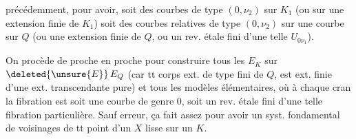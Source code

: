 précédemment, pour avoir, soit des courbes de type $(0,\nu_2)$ sur $K_1$\unsure{,} (ou sur une extension finie de $K_1$) soit des courbes relatives de type $(0,\nu_2)$ sur une courbe sur $Q$  (ou une extension finie de $Q$, ou un rev.  étale fini d'une telle $U_{0\nu_1}$).

On procède de proche en proche pour construire  tous les $E_K$ sur $\deleted{\unsure{E}}\,E_Q$ (car tt corps ext. de type fini de $Q$, est ext. finie d'une ext. transcendante pure) et tous les modèles élémentaires, où à chaque cran la fibration est soit une courbe de genre $0$, soit un rev. étale fini d'une telle fibration particulière. Sauf erreur, ça fait assez pour avoir un syst. fondamental de voisinages de tt point d'un $X$ lisse sur un $K$.
